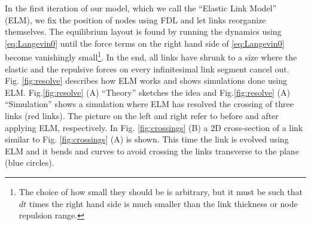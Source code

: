 \documentclass[nofootinbib,preprint,floatfix,endfloats]{revtex4} %
\begin{document}

In the first iteration of our model, which we call the ``Elastic Link Model'' (ELM), we fix the position of nodes using FDL and let links reorganize themselves. 
The equilibrium layout is found by %
running the dynamics using  \eqref{eq:Langevin0} until the force terms on the right hand side of \eqref{eq:Langevin0} become vanishingly small\footnote{The choice of how small they should be is arbitrary, but it must be such that $dt$ times the right hand side is much smaller than the link thickness or node repulsion range.}. 
In the end, all links have shrunk to a size where the elastic and the repulsive forces on every infinitesimal link segment cancel out. 
Fig. \ref{fig:resolve} describes how ELM works and shows  simulations done using ELM. 
Fig.\ref{fig:resolve} (A) ``Theory'' sketches the idea and Fig.\ref{fig:resolve} (A) ``Simulation'' shows a simulation where ELM has resolved the crossing of three links (red links). 
The picture on the left and right refer to before and after applying ELM, respectively. In Fig. \ref{fig:crossings} (B) a 2D cross-section of a link similar to  Fig. \ref{fig:crossings} (A) is shown.
This time the link is evolved using ELM and it bends and curves to avoid crossing the links transverse to the plane (blue circles). 
%
\end{document}
